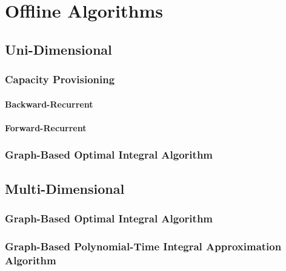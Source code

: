 
\chapter{Offline Algorithms}\label{chapter:offline_algorithms}

\section{Uni-Dimensional}

\subsection{Capacity Provisioning}

\subsubsection{Backward-Recurrent}

\subsubsection{Forward-Recurrent}

\subsection{Graph-Based Optimal Integral Algorithm}

\section{Multi-Dimensional}

\subsection{Graph-Based Optimal Integral Algorithm}

\subsection{Graph-Based Polynomial-Time Integral Approximation Algorithm}
